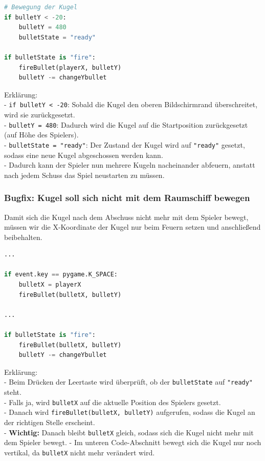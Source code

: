 \documentclass{article}
\begin{document}
\begin{lstlisting}[style=pythonstyle, language=Python]
# Bewegung der Kugel
if bulletY < -20: 
    bulletY = 480
    bulletState = "ready"

if bulletState is "fire":
    fireBullet(playerX, bulletY) 
    bulletY -= changeYbullet
\end{lstlisting}

Erklärung:\\
- \texttt{if bulletY < -20}: Sobald die Kugel den oberen Bildschirmrand überschreitet, wird sie zurückgesetzt.\\
- \texttt{bulletY = 480}: Dadurch wird die Kugel auf die Startposition zurückgesetzt (auf Höhe des Spielers).\\
- \texttt{bulletState = "ready"}: Der Zustand der Kugel wird auf \texttt{"ready"} gesetzt, sodass eine neue Kugel abgeschossen werden kann.\\
- Dadurch kann der Spieler nun mehrere Kugeln nacheinander abfeuern, anstatt nach jedem Schuss das Spiel neustarten zu müssen.\\

\subsubsection{Bugfix: Kugel soll sich nicht mit dem Raumschiff bewegen}
Damit sich die Kugel nach dem Abschuss nicht mehr mit dem Spieler bewegt, müssen wir die X-Koordinate der Kugel nur beim Feuern setzen und anschließend beibehalten.

\begin{lstlisting}[style=pythonstyle, language=Python]
...

if event.key == pygame.K_SPACE:
    bulletX = playerX
    fireBullet(bulletX, bulletY) 

...

if bulletState is "fire":
    fireBullet(bulletX, bulletY) 
    bulletY -= changeYbullet
\end{lstlisting}

Erklärung:\\
- Beim Drücken der Leertaste wird überprüft, ob der \texttt{bulletState} auf \texttt{"ready"} steht.\\
- Falls ja, wird \texttt{bulletX} auf die aktuelle Position des Spielers gesetzt.\\
- Danach wird \texttt{fireBullet(bulletX, bulletY)} aufgerufen, sodass die Kugel an der richtigen Stelle erscheint.\\
- \textbf{Wichtig:} Danach bleibt \texttt{bulletX} gleich, sodass sich die Kugel nicht mehr mit dem Spieler bewegt.
- Im unteren Code-Abschnitt bewegt sich die Kugel nur noch vertikal, da \texttt{bulletX} nicht mehr verändert wird.
\end{document}
